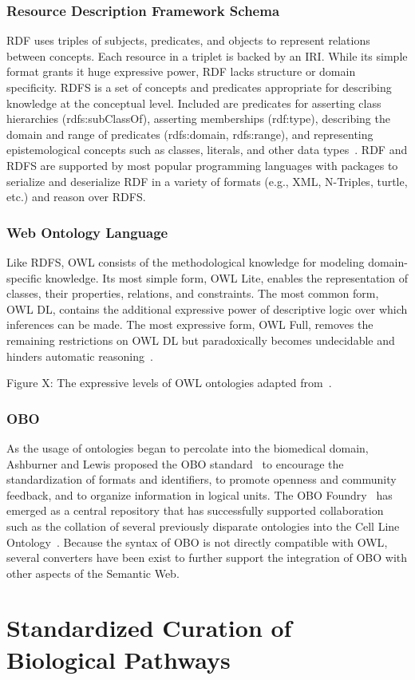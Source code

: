 \subsubsection{Resource Description Framework Schema}

\ac{RDF} uses triples of subjects, predicates, and objects to represent relations between concepts.
Each resource in a triplet is backed by an \ac{IRI}.
While its simple format grants it huge expressive power, \ac{RDF} lacks structure or domain specificity.
\ac{RDFS} is a set of concepts and predicates appropriate for describing knowledge at the conceptual level.
Included are predicates for asserting class hierarchies (rdfs:subClassOf), asserting memberships (rdf:type), describing the domain and range of predicates (rdfs:domain, rdfs:range), and representing epistemological concepts such as classes, literals, and other data types~\cite{Beckett2014}.
RDF and RDFS are supported by most popular programming languages with packages to serialize and deserialize RDF in a variety of formats (e.g., \ac{XML}, N-Triples, turtle, etc.) and reason over \ac{RDFS}.

\subsubsection{Web Ontology Language}

Like \ac{RDFS}, \ac{OWL} consists of the methodological knowledge for modeling domain-specific knowledge.
Its most simple form, \ac{OWL} Lite, enables the representation of classes, their properties, relations, and constraints.
The most common form, \ac{OWL} \ac{DL}, contains the additional expressive power of descriptive logic over which inferences can be made.
The most expressive form, \ac{OWL} Full, removes the remaining restrictions on \ac{OWL} \ac{DL} but paradoxically becomes undecidable and hinders automatic reasoning~\cite{Marchetti2008}.

Figure X: The expressive levels of OWL ontologies adapted from~\cite{Marchetti2008}.

\subsubsection{OBO}

As the usage of ontologies began to percolate into the biomedical domain, Ashburner and Lewis proposed the \ac{OBO} standard~\cite{Ashburner2003} to encourage the standardization of formats and identifiers, to promote openness and community feedback, and to organize information in logical units.
The OBO Foundry~\cite{Smith2007} has emerged as a central repository that has successfully supported collaboration such as the collation of several previously disparate ontologies into the Cell Line Ontology~\cite{Sarntivijai2014}.
Because the syntax of \ac{OBO} is not directly compatible with \ac{OWL}, several converters have been exist to further support the integration of \ac{OBO} with other aspects of the Semantic Web.

\section{Standardized Curation of Biological Pathways}